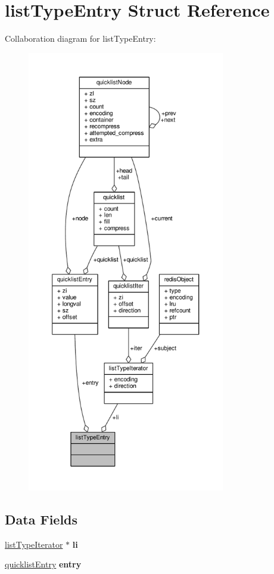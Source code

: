 \hypertarget{structlistTypeEntry}{}\section{list\+Type\+Entry Struct Reference}
\label{structlistTypeEntry}


Collaboration diagram for list\+Type\+Entry\+:\nopagebreak
\begin{figure}[H]
\begin{center}
\leavevmode
\includegraphics[height=550pt]{structlistTypeEntry__coll__graph}
\end{center}
\end{figure}
\subsection*{Data Fields}
\begin{DoxyCompactItemize}
\item 
\mbox{\label{structlistTypeEntry_a8c1e29e3167e162812c9576c694d57e9}} 
\hyperlink{structlistTypeIterator}{list\+Type\+Iterator} $\ast$ {\bfseries li}
\item 
\mbox{\label{structlistTypeEntry_a401bf1756d19b191677776171230639c}} 
\hyperlink{structquicklistEntry}{quicklist\+Entry} {\bfseries entry}
\end{DoxyCompactItemize}


